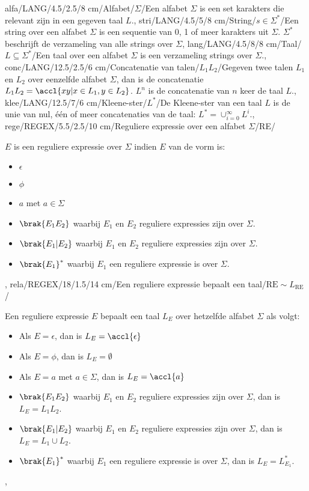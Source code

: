 alfa/LANG/4.5/2.5/8 cm/Alfabet/{$\Sigma$}/{Een alfabet $\Sigma$ is een set karakters die relevant zijn in een gegeven taal $L$.},
stri/LANG/4.5/5/8 cm/String/{$s\in\Sigma^*$}/{Een string over een alfabet $\Sigma$ is een sequentie van 0, 1 of meer karakters uit $\Sigma$. $\Sigma^*$ beschrijft de verzameling van alle strings over $\Sigma$},
lang/LANG/4.5/8/8 cm/Taal/{$L\subseteq\Sigma^*$}/{Een taal over een alfabet $\Sigma$ is een verzameling strings over $\Sigma$.},
conc/LANG/12.5/2.5/6 cm/Concatenatie van talen/{$L_1L_2$}/{Gegeven twee talen $L_1$ en $L_2$ over eenzelfde alfabet $\Sigma$, dan is de concatenatie $L_1L_2=\accl{xy|x\in L_1,y\in L_2}$. $L^n$ is de concatenatie van $n$ keer de taal $L$.},
klee/LANG/12.5/7/6 cm/Kleene-ster/{$L^*$}/{De Kleene-ster van een taal $L$ is de unie van nul, \'e\'en of meer concatenaties van de taal: $L^*=\displaystyle\cup_{i=0}^{\infty}{L^i}$.},
rege/REGEX/5.5/2.5/10 cm/Reguliere expressie over een alfabet $\Sigma$/RE/{$E$ is een reguliere expressie over $\Sigma$ indien $E$ van de vorm is:\begin{itemize}
 \item $\epsilon$
 \item $\phi$
 \item $a$ met $a\in\Sigma$
 \item $\brak{E_1E_2}$ waarbij $E_1$ en $E_2$ reguliere expressies zijn over $\Sigma$.
 \item $\brak{E_1|E_2}$ waarbij $E_1$ en $E_2$ reguliere expressies zijn over $\Sigma$.
 \item $\brak{E_1}^*$ waarbij $E_1$ een reguliere expressie is over $\Sigma$.
\end{itemize}},
rela/REGEX/18/1.5/14 cm/Een reguliere expressie bepaalt een taal/$\mbox{RE}\sim L_{\mbox{RE}}$/{Een reguliere expressie $E$ bepaalt een taal $L_E$ over hetzelfde alfabet $\Sigma$ als volgt:\begin{itemize}
 \item Als $E=\epsilon$, dan is $L_E=\accl{\epsilon}$
 \item Als $E=\phi$, dan is $L_E=\emptyset$
 \item Als $E=a$ met $a\in\Sigma$, dan is $L_E=\accl{a}$
 \item $\brak{E_1E_2}$ waarbij $E_1$ en $E_2$ reguliere expressies zijn over $\Sigma$, dan is $L_E=L_1L_2$.
 \item $\brak{E_1|E_2}$ waarbij $E_1$ en $E_2$ reguliere expressies zijn over $\Sigma$, dan is $L_E=L_1\cup L_2$.
 \item $\brak{E_1}^*$ waarbij $E_1$ een reguliere expressie is over $\Sigma$, dan is $L_E=L_{E_1}^*$.
\end{itemize}},
